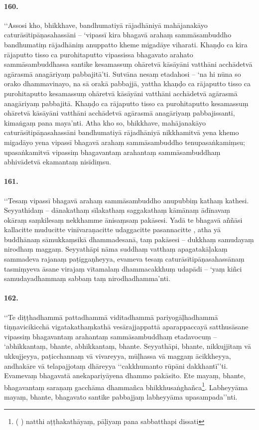 \paragraph{160.} ‘‘Assosi kho, bhikkhave, bandhumatiyā rājadhāniyā mahājanakāyo caturāsītipāṇasahassāni – ‘vipassī kira bhagavā arahaṃ sammāsambuddho bandhumatiṃ rājadhāniṃ anuppatto kheme migadāye viharati. Khaṇḍo ca kira rājaputto tisso ca purohitaputto vipassissa bhagavato arahato sammāsambuddhassa santike kesamassuṃ ohāretvā kāsāyāni vatthāni acchādetvā agārasmā anagāriyaṃ pabbajitā’ti. Sutvāna nesaṃ etadahosi – ‘na hi nūna so orako dhammavinayo, na sā orakā pabbajjā, yattha khaṇḍo ca rājaputto tisso ca purohitaputto kesamassuṃ ohāretvā kāsāyāni vatthāni acchādetvā agārasmā anagāriyaṃ pabbajitā. Khaṇḍo ca rājaputto tisso ca purohitaputto kesamassuṃ ohāretvā kāsāyāni vatthāni acchādetvā agārasmā anagāriyaṃ pabbajissanti, kimaṅgaṃ pana maya’nti. Atha kho so, bhikkhave, mahājanakāyo caturāsītipāṇasahassāni bandhumatiyā rājadhāniyā nikkhamitvā yena khemo migadāyo yena vipassī bhagavā arahaṃ sammāsambuddho tenupasaṅkamiṃsu; upasaṅkamitvā vipassiṃ bhagavantaṃ arahantaṃ sammāsambuddhaṃ abhivādetvā ekamantaṃ nisīdiṃsu.

\paragraph{161.} ‘‘Tesaṃ vipassī bhagavā arahaṃ sammāsambuddho anupubbiṃ kathaṃ kathesi. Seyyathidaṃ – dānakathaṃ sīlakathaṃ saggakathaṃ kāmānaṃ ādīnavaṃ okāraṃ saṃkilesaṃ nekkhamme ānisaṃsaṃ pakāsesi. Yadā te bhagavā aññāsi kallacitte muducitte vinīvaraṇacitte udaggacitte pasannacitte , atha yā buddhānaṃ sāmukkaṃsikā dhammadesanā, taṃ pakāsesi – dukkhaṃ samudayaṃ nirodhaṃ maggaṃ. Seyyathāpi nāma suddhaṃ vatthaṃ apagatakāḷakaṃ sammadeva rajanaṃ paṭiggaṇheyya, evameva tesaṃ caturāsītipāṇasahassānaṃ tasmiṃyeva āsane virajaṃ vītamalaṃ dhammacakkhuṃ udapādi – ‘yaṃ kiñci samudayadhammaṃ sabbaṃ taṃ nirodhadhamma’nti.

\paragraph{162.} ‘‘Te diṭṭhadhammā pattadhammā viditadhammā pariyogāḷhadhammā tiṇṇavicikicchā vigatakathaṃkathā vesārajjappattā aparappaccayā satthusāsane vipassiṃ bhagavantaṃ arahantaṃ sammāsambuddhaṃ etadavocuṃ – ‘abhikkantaṃ, bhante, abhikkantaṃ, bhante. Seyyathāpi, bhante, nikkujjitaṃ vā ukkujjeyya, paṭicchannaṃ vā vivareyya, mūḷhassa vā maggaṃ ācikkheyya, andhakāre vā telapajjotaṃ dhāreyya ‘‘cakkhumanto rūpāni dakkhantī’’ti. Evamevaṃ bhagavatā anekapariyāyena dhammo pakāsito. Ete mayaṃ, bhante, bhagavantaṃ saraṇaṃ gacchāma dhammañca bhikkhusaṅghañca\footnote{( ) natthi aṭṭhakathāyaṃ, pāḷiyaṃ pana sabbatthapi dissati}. Labheyyāma mayaṃ, bhante, bhagavato santike pabbajjaṃ labheyyāma upasampada’’nti.

